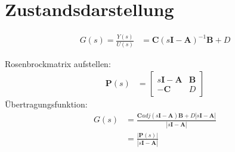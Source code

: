 \section{Zustandsdarstellung}

\begin{tcolorbox}[colback=white!10!white,colframe=blue!70!black,title=Übertragungsfunktion aus Zustandsraumdarstellung]
	\begin{tcolorbox}[colback=white!10!white,colframe=gray!70!black,title=Matrixinversion]
		
		\begin{align*}
			G(s) = \frac{Y(s)}{U(s)} &= \boldsymbol{C}(s\boldsymbol{I}-\boldsymbol{A})^{-1}\boldsymbol{B}+D
		\end{align*}
	\end{tcolorbox}
	
	\begin{tcolorbox}[colback=white!10!white,colframe=gray!70!black,title=Verallgemeinerte Systemmatrix]
			Rosenbrockmatrix aufstellen:
			\begin{align*}
				\boldsymbol{P}(s) &= 
			\left[\begin{array}{c|c}
			s\boldsymbol{I}-\boldsymbol{A} & \boldsymbol{B} \\\hline
			-\boldsymbol{C} & D 
			\end{array}\right]	
			\end{align*}
		Übertragungsfunktion:
		\begin{align*}
			G(s) &= \frac{\boldsymbol{C} adj(s\boldsymbol{I}-\boldsymbol{A})\boldsymbol{B}+D|s\boldsymbol{I}-\boldsymbol{A}|}{|s\boldsymbol{I}-\boldsymbol{A}|}\\
			&= \frac{|\boldsymbol{P}(s)|}{|s\boldsymbol{I}-\boldsymbol{A}|}
		\end{align*}
			
	\end{tcolorbox}
	
\end{tcolorbox}
